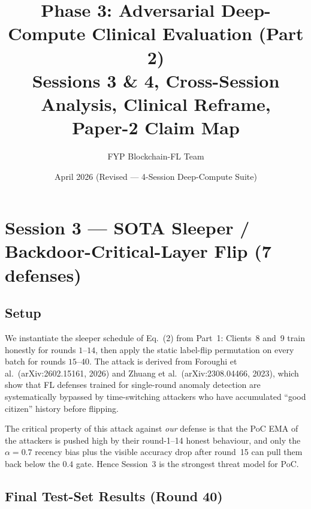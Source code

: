 \documentclass[11pt,a4paper]{article}
\title{
    \vspace{-1cm}
    \textbf{Phase 3: Adversarial Deep-Compute Clinical Evaluation (Part 2)} \\[0.3cm]
    \large Sessions 3 \& 4, Cross-Session Analysis, Clinical Reframe, \\
    \large Paper-2 Claim Map
}
\author{FYP Blockchain-FL Team}
\date{April 2026 (Revised --- 4-Session Deep-Compute Suite)}
\begin{document}
\maketitle
\thispagestyle{fancy}
\tableofcontents
\newpage

\section{Session 3 --- SOTA Sleeper / Backdoor-Critical-Layer Flip (7 defenses)}
\label{sec:session3}

\subsection{Setup}

We instantiate the sleeper schedule of Eq.~(2) from Part~1: Clients~8
and~9 train honestly for rounds $1$--$14$, then apply the static label-flip
permutation on every batch for rounds $15$--$40$. The attack is derived
from Foroughi et al.\ (arXiv:2602.15161, 2026) and Zhuang et al.\
(arXiv:2308.04466, 2023), which show that FL defenses trained for
single-round anomaly detection are systematically bypassed by
time-switching attackers who have accumulated ``good citizen'' history
before flipping.

The critical property of this attack against \textit{our} defense is that
the PoC EMA of the attackers is pushed high by their round-1--14 honest
behaviour, and only the $\alpha=0.7$ recency bias plus the visible
accuracy drop after round~15 can pull them back below the $0.4$ gate.
Hence Session~3 is the strongest threat model for PoC.

\subsection{Final Test-Set Results (Round 40)}
\end{document}
